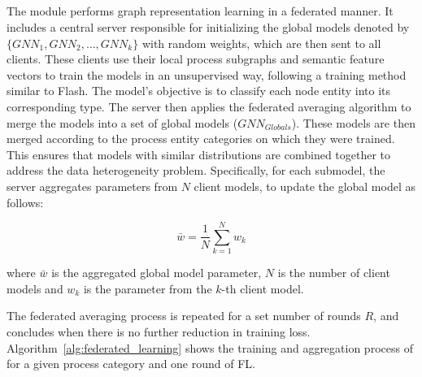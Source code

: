 \subsection{\fpgl}
\label{sys:fpgl}


The module performs graph representation learning in a federated manner. It includes a central server responsible for initializing the global \gnnshort models denoted by \(\{GNN_1, GNN_2, \ldots, GNN_k\} \) with random weights, which are then sent to all clients. These clients use their local process subgraphs and semantic feature vectors to train the \gnnshort models in an unsupervised way, following a training method similar to Flash. The \gnnshort model's objective is to classify each node entity into its corresponding type. The server then applies the federated averaging algorithm to merge the \gnnshort models into a set of global models (\( GNN_{Globals} \)). These models are then merged according to the process entity categories on which they were trained. This ensures that models with similar distributions are combined together to address the data heterogeneity problem. Specifically, for each submodel, the server aggregates parameters from \(N\) client models, to update the global model as follows:

\begin{equation}
\bar{w} = \frac{1}{N} \sum_{k=1}^{N}w_k
\end{equation}

where \(\bar{w}\) is the aggregated global model parameter, \(N\) is the number of client models and \(w_k\) is the parameter from the \(k\)-th client model.

The federated averaging process is repeated for a set number of rounds \(R\), and concludes when there is no further reduction in training loss. Algorithm~\ref{alg:federated_learning} shows the training and aggregation process of \gnnshort for a given process category and one round of FL.

